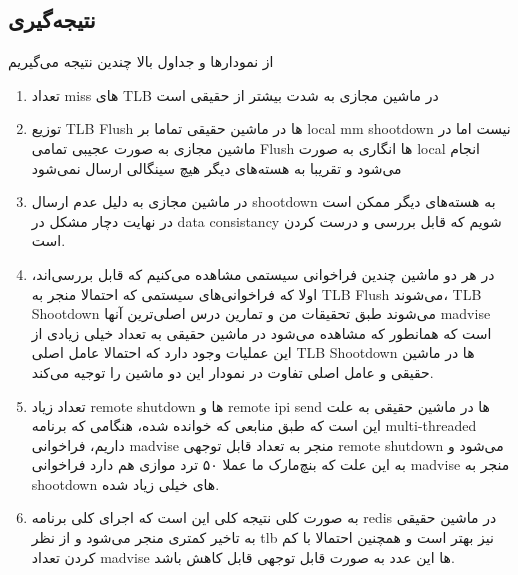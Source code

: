\subsection{نتیجه‌گیری}
  از نمودارها و جداول بالا چندین نتیجه‌ می‌گیریم
 \begin{enumerate}
     \item تعداد miss های TLB در ماشین مجازی به شدت بیشتر از حقیقی است
     \item توزیع TLB Flush ها در ماشین حقیقی تماما بر local mm shootdown نیست 
     اما در ماشین مجازی به صورت عجیبی تمامی Flush ها انگاری به صورت local انجام می‌شود و تقریبا به هسته‌های دیگر هیچ سینگالی ارسال نمی‌شود
     \item در ماشین مجازی به دلیل عدم ارسال shootdown به هسته‌های دیگر ممکن است در نهایت دچار مشکل در data consistancy شویم که قابل بررسی و درست کردن است.
    \item در هر دو ماشین چندین فراخوانی سیستمی مشاهده می‌کنیم که قابل بررسی‌اند، اولا که فراخوانی‌های سیستمی که احتمالا منجر به TLB Flush می‌شوند، TLB Shootdown 
    می‌شوند طبق تحقیقات من و تمارین درس اصلی‌ترین آنها madvise است که همانطور که مشاهده می‌شود در ماشین حقیقی به تعداد خیلی زیادی از این عملیات وجود دارد که احتمالا عامل اصلی TLB Shootdown ها در ماشین حقیقی و عامل اصلی تفاوت در نمودار این دو ماشین را توجیه می‌کند.
    \item 
    تعداد زیاد remote shutdown ها و remote ipi send ها در ماشین حقیقی به علت این است که طبق
    منابعی که خوانده شده، هنگامی که برنامه multi-threaded داریم، فراخوانی
    madvise
    منجر به تعداد قابل توجهی remote shutdown می‌شود و 
    به این علت که بنچ‌مارک ما عملا ۵۰ ترد موازی هم دارد فراخوانی madvise منجر به 
    shootdown های خیلی زیاد شده.
    \item 
    به صورت کلی نتیجه کلی این است که اجرای کلی برنامه redis در
    ماشین حقیقی به تاخیر کمتری منجر می‌شود و از نظر tlb نیز بهتر است و همچنین احتمالا با کم کردن تعداد madvise ها این عدد به صورت قابل توجهی قابل کاهش باشد.
 \end{enumerate}